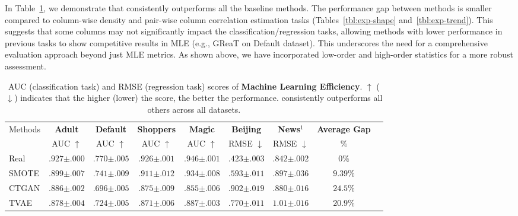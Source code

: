 In Table~\ref{tbl:exp-mle}, we demonstrate that \modelname consistently outperforms all the baseline methods. The performance gap between methods is smaller compared to column-wise density and pair-wise column correlation estimation tasks (Tables~\ref{tbl:exp-shape} and~\ref{tbl:exp-trend}). This suggests that some columns may not significantly impact the classification/regression tasks, allowing methods with lower performance in previous tasks to show competitive results in MLE (e.g., GReaT on Default dataset). This underscores the need for a comprehensive evaluation approach beyond just MLE metrics. As shown above, we have incorporated low-order and high-order statistics for a more robust assessment.

\begin{table}[t!] 
    \centering
    \caption{AUC (classification task) and RMSE (regression task) scores of \textbf{Machine Learning Efficiency}. $\uparrow$ ($\downarrow$) indicates that the higher (lower) the score, the better the performance. \modelname consistently outperforms all others across all datasets.} 
    \label{tbl:exp-mle}
    \small
    \begin{threeparttable}
    {
    \scalebox{0.92}
    {
	\begin{tabular}{lcccccc|cc}
            \toprule[0.8pt]
            \multirow{2}{*}{Methods} & {\textbf{Adult}} &{\textbf{Default}} & \textbf{Shoppers} & {\textbf{Magic}} &   {\textbf{Beijing}} & {\textbf{News}}$^1$ & {\textbf{Average Gap}} \\
            \cmidrule{2-8} 
            & AUC $\uparrow$ & AUC $\uparrow$ &  AUC $\uparrow$ &  AUC $\uparrow$  & RMSE $\downarrow$ &  RMSE $\downarrow$ & $\%$ \\
            \midrule 
            Real & $.927${\tiny$\pm.000$} & $.770${\tiny$\pm.005$} & $.926${\tiny$\pm.001$}  & $.946${\tiny$\pm.001$}  & $.423${\tiny$\pm.003$} & $.842${\tiny$\pm.002$} & $0\%$  \\
            \midrule
            SMOTE & $.899${\tiny$\pm.007$} &$.741${\tiny$\pm.009$} & $.911${\tiny$\pm.012$} & $.934${\tiny$\pm.008$} & $.593${\tiny$\pm.011$} & $.897${\tiny$\pm.036$} & $9.39\%$  \\
            \midrule
            CTGAN & $.886${\tiny$\pm.002$} &$.696${\tiny$\pm.005$} & $.875${\tiny$\pm.009$} & $.855${\tiny$\pm.006$}    & $.902${\tiny$\pm.019$} & $.880${\tiny$\pm.016$} & $24.5\%$ \\
            TVAE  & $.878${\tiny$\pm.004$} &$.724 ${\tiny$\pm.005$} & $.871${\tiny$\pm.006$} & $.887${\tiny$\pm.003$} & $.770${\tiny$\pm.011$} & $1.01${\tiny$\pm.016$} & $20.9\%$  \\

\end{tabular}}}
\end{threeparttable}
\end{table}
